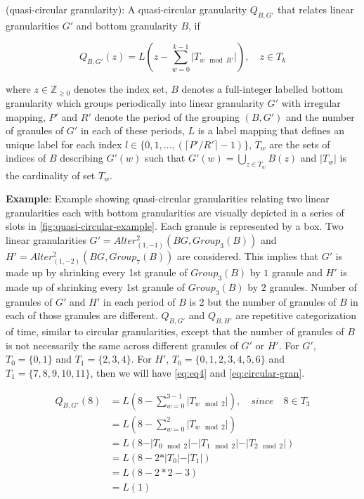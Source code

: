 \documentclass[12pt]{article}
\begin{document}
\begin{definition}\label{def:quasicircular}
(quasi-circular granularity): A quasi-circular granularity $Q_{B, G'}$ that relates linear granularities $G'$ and bottom granularity $B$, if

\begin{equation}\label{eq:quasi}
Q_{B, G'}(z) = L(z - \sum_{w=0}^{k-1}\vert T_{w \mod R'} \vert), \quad z \in T_k
\end{equation}

where
$z \in \mathbb{Z}_{\geq 0}$ denotes the index set,
$B$ denotes a full-integer labelled bottom granularity which groups periodically into linear granularity $G'$ with irregular mapping, $P'$ and $R'$ denote the period of the grouping $(B, G')$ and the number of granules of $G'$ in each of these periods, ${L}$ is a label mapping that defines an unique label for each index $l \in \{0,1,\dots, (\lceil P'/R' \rceil-1)\}$, $T_w$ are the sets of indices of $B$ describing $G'(w)$ such that  $G'(w) = \bigcup_{z \in T_w}B(z)$ and $\vert T_w \vert$ is the cardinality of set $T_w$.
\end{definition}

\textbf{Example}: Example showing quasi-circular granularities relating two linear granularities each with bottom granularities are visually depicted in a series of slots in \autoref{fig:quasi-circular-example}. Each granule is represented by a box. Two linear granularities \(G' = Alter^{2}_{(1,-1)}(BG, Group_3(B))\) and \(H' = Alter^{2}_{(1,-2)}(BG, Group_7(B))\) are considered. This implies that \(G'\) is made up by shrinking every 1st granule of \(Group_3(B)\) by \(1\) granule and \(H'\) is made up of shrinking every 1st granule of \(Group_3(B)\) by \(2\) granules. Number of granules of \(G'\) and \(H'\) in each period of \(B\) is 2 but the number of granules of \(B\) in each of those granules are different. \(Q_{B, G'}\) and \(Q_{B, H'}\) are repetitive categorization of time, similar to circular granularities, except that the number of granules of \(B\) is not necessarily the same across different granules of \(G'\) or \(H'\). For \(G'\), \(T_0 = \{0,1\}\) and \(T_1 = \{2, 3, 4\}\). For \(H'\), \(T_0 = \{0, 1, 2, 3, 4, 5, 6\}\) and \(T_1 = \{7, 8, 9, 10, 11\}\), then we will have \autoref{eq:eq4} and \autoref{eq:circular-gran}.

\begin{equation} \label{eq:eq4}
\begin{split}
Q_{B,G'}(8) & = L(8 - \sum_{w=0}^{3-1}\vert T_{w \mod 2}\vert) ,\quad since \quad 8 \in T_{3} \\
  & = L(8 - \sum_{w=0}^{2}\vert T_{w\mod 2}\vert) \\
  & = L(8 - \vert T_{0 \mod 2}\vert - \vert T_{1 \mod 2}\vert - \vert T_{2 \mod 2}\vert) \\
  & = L(8 - 2*\vert T_{0}\vert - \vert T_{1}\vert) \\
  & = L(8 - 2*2 - 3) \\
  & = L(1) \\
\end{split}
\end{equation}
\end{document}

